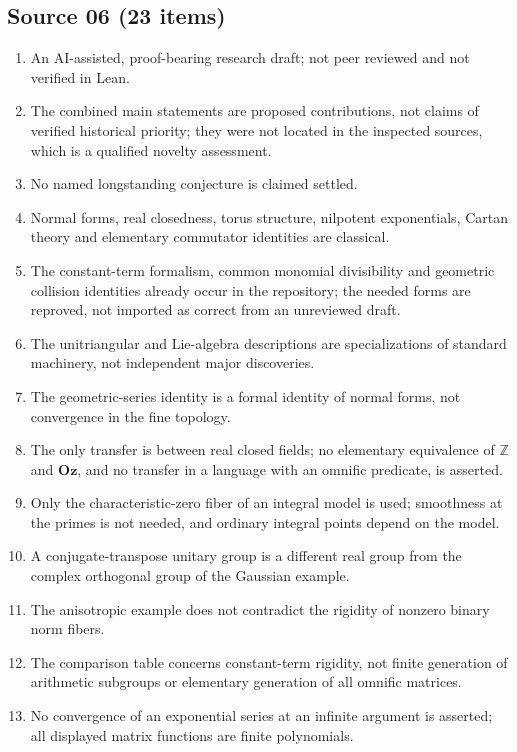 \documentclass[11pt,oneside]{article}
\numberwithin{equation}{section}
\theoremstyle{definition}
\theoremstyle{remark}
\newcommand{\Oz}{\mathbf{Oz}}
\newcommand{\Z}{\mathbb Z}
\begin{document}
\subsection{Source 06 (23 items)}
\begin{enumerate}[leftmargin=*,widest=00,label=06.\arabic*]
\item An AI-assisted, proof-bearing research draft; not peer reviewed and not
verified in Lean.
\item The combined main statements are proposed contributions, not claims of
verified historical priority; they were not located in the inspected sources,
which is a qualified novelty assessment.
\item No named longstanding conjecture is claimed settled.
\item Normal forms, real closedness, torus structure, nilpotent exponentials,
Cartan theory and elementary commutator identities are classical.
\item The constant-term formalism, common monomial divisibility and geometric
collision identities already occur in the repository; the needed forms are
reproved, not imported as correct from an unreviewed draft.
\item The unitriangular and Lie-algebra descriptions are specializations of
standard machinery, not independent major discoveries.
\item The geometric-series identity is a formal identity of normal forms, not
convergence in the fine topology.
\item The only transfer is between real closed fields; no elementary equivalence
of $\Z$ and $\Oz$, and no transfer in a language with an omnific predicate, is
asserted.
\item Only the characteristic-zero fiber of an integral model is used; smoothness
at the primes is not needed, and ordinary integral points depend on the model.
\item A conjugate-transpose unitary group is a different real group from the
complex orthogonal group of the Gaussian example.
\item The anisotropic example does not contradict the rigidity of nonzero binary
norm fibers.
\item The comparison table concerns constant-term rigidity, not finite generation
of arithmetic subgroups or elementary generation of all omnific matrices.
\item No convergence of an exponential series at an infinite argument is
asserted; all displayed matrix functions are finite polynomials.

\end{enumerate}
\end{document}
